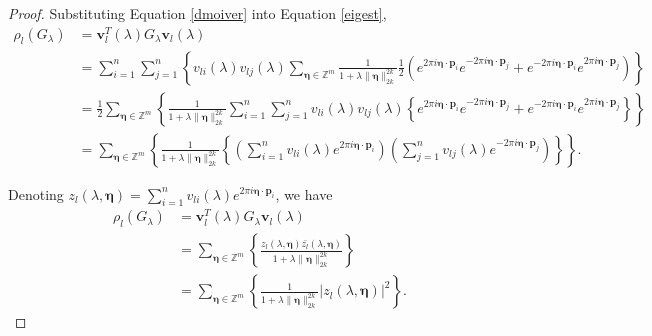 \documentclass[multixcb]{amstext-l}
\theoremstyle{plain}
\theoremstyle{definition}
\theoremstyle{definition}
\theoremstyle{remark}
\numberwithin{equation}{chapter}
\begin{document}
\begin{proof}
Substituting Equation \ref{dmoiver} into Equation \ref{eigest},
\begin{equation}\label{eigenest_cont}
    \begin{aligned}
        \rho_l(G_{\lambda}) &= \boldsymbol{v}_l^T(\lambda)G_{\lambda}\boldsymbol{v}_l(\lambda)\\
        &= \sum\limits_{i=1}^n\sum\limits_{j=1}^n\left\{v_{li}(\lambda)v_{lj}(\lambda)\sum_{\boldsymbol{\eta}\in\mathbb{Z}^m} \frac{1}{1+\lambda\|\boldsymbol{\eta}\|_{2k}^{2k}} \frac{1}{2}\left(e^{2\pi i \boldsymbol{\eta}\cdot\boldsymbol{p}_i } e^{-2\pi i \boldsymbol{\eta}\cdot\boldsymbol{p}_j} + e^{-2\pi i \boldsymbol{\eta}\cdot\boldsymbol{p}_i } e^{2\pi i \boldsymbol{\eta}\cdot\boldsymbol{p}_j}\right)\right\}\\
        &= \frac{1}{2}\sum_{\boldsymbol{\eta}\in\mathbb{Z}^m}\left\{ \frac{1}{1+\lambda\|\boldsymbol{\eta}\|_{2k}^{2k}}\sum\limits_{i=1}^n\sum\limits_{j=1}^n v_{li}(\lambda)v_{lj}(\lambda)\left\{e^{2\pi i \boldsymbol{\eta}\cdot\boldsymbol{p}_i } e^{-2\pi i \boldsymbol{\eta}\cdot\boldsymbol{p}_j} + e^{-2\pi i \boldsymbol{\eta}\cdot\boldsymbol{p}_i } e^{2\pi i \boldsymbol{\eta}\cdot\boldsymbol{p}_j}
\right\} \right\}\\
        &= \sum_{\boldsymbol{\eta}\in\mathbb{Z}^m}\left\{ \frac{1}{1+\lambda\|\boldsymbol{\eta}\|_{2k}^{2k}}\left\{\left( \sum\limits_{i=1}^n v_{li}(\lambda)e^{2\pi i \boldsymbol{\eta}\cdot\boldsymbol{p}_i } \right) \left( \sum\limits_{j=1}^n v_{lj}(\lambda)e^{-2\pi i \boldsymbol{\eta}\cdot\boldsymbol{p}_j } \right) \right\} \right\}. 
\end{aligned}
\end{equation}

Denoting $z_l(\lambda,\boldsymbol{\eta}) = \sum\limits_{i=1}^n v_{li}(\lambda) e^{2\pi i \boldsymbol{\eta}\cdot\boldsymbol{p}_i }$, we have
\begin{equation}\label{eigenest_cont2}
\begin{aligned}
    \rho_l(G_{\lambda}) &= \boldsymbol{v}_l^T(\lambda)G_{\lambda}\boldsymbol{v}_l(\lambda)\\
    &= \sum_{\boldsymbol{\eta}\in\mathbb{Z}^m}\left\{ \frac{z_l(\lambda,\boldsymbol{\eta})\bar{z_l}(\lambda,\boldsymbol{\eta})}{1+\lambda\|\boldsymbol{\eta}\|_{2k}^{2k}}\right\}\\
    &= \sum_{\boldsymbol{\eta}\in\mathbb{Z}^m}\left\{ \frac{1}{1+\lambda\|\boldsymbol{\eta}\|_{2k}^{2k}}\left|z_l(\lambda,\boldsymbol{\eta})\right|^2 \right\}.
\end{aligned}
\end{equation}



\end{proof}
\end{document}
